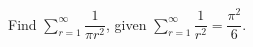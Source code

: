 Find $\sum_{r=1}^{\infty}\dfrac{1}{\pi r^2}$, given $\sum_{r=1}^{\infty}\dfrac{1}{r^2}=\dfrac{\pi^2}{6}$.
